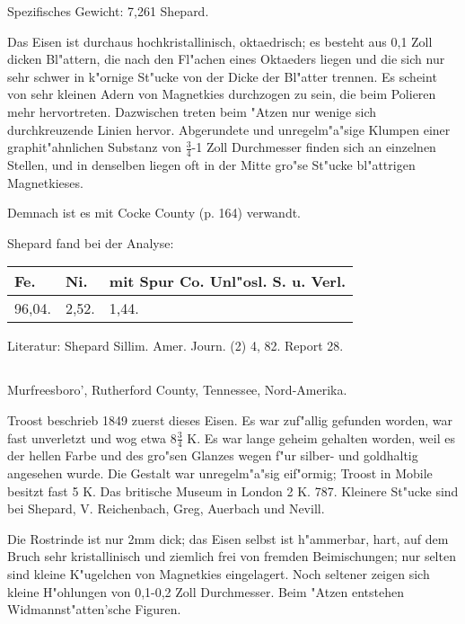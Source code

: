 \documentclass[a4paper, 11pt, oneside]{article}
\begin{document}
Spezifisches Gewicht: 7,261 Shepard.

Das Eisen ist durchaus hochkristallinisch, oktaedrisch; es besteht aus 0,1 Zoll dicken Bl"attern, die nach den Fl"achen eines Oktaeders liegen und die sich nur sehr schwer in k"ornige St"ucke von der Dicke der Bl"atter trennen. Es scheint von sehr kleinen Adern von Magnetkies durchzogen zu sein, die beim Polieren mehr hervortreten. Dazwischen treten beim "Atzen nur wenige sich durchkreuzende Linien hervor. Abgerundete und unregelm"a"sige Klumpen einer graphit"ahnlichen Substanz von $\mathfrak{\frac{3}{4}}$-1 Zoll Durchmesser finden sich an einzelnen Stellen, und in denselben liegen oft in der Mitte gro"se St"ucke bl"attrigen Magnetkieses.

Demnach ist es mit Cocke County (p. 164) verwandt.

Shepard fand bei der Analyse:
\begin{table}[H]
    \centering\swabfamily\Large
    \begin{tabular}{l l l}
        Fe. & Ni. & mit Spur Co. Unl"osl. S. u. Verl. \\ \hline
        96,04. & 2,52. & 1,44. \\
    \end{tabular}
\end{table}

\normalsize
Literatur: Shepard Sillim. Amer. Journ. (2) 4, 82. Report 28.

\subsection{}
\LARGE
\paragraph{}
Murfreesboro', Rutherford County, Tennessee, Nord-Amerika.

Troost beschrieb 1849 zuerst dieses Eisen. Es war zuf"allig gefunden worden, war fast unverletzt und wog etwa $\mathfrak{8\frac{3}{4}}$ K. Es war lange geheim gehalten worden, weil es der hellen Farbe und des gro"sen Glanzes wegen f"ur silber- und goldhaltig angesehen wurde. Die Gestalt war unregelm"a"sig eif"ormig; Troost in Mobile besitzt fast 5 K. Das britische Museum in London 2 K. 787. Kleinere St"ucke sind bei Shepard, V. Reichenbach, Greg, Auerbach und Nevill.

Die Rostrinde ist nur 2mm dick; das Eisen selbst ist h"ammerbar, hart, auf dem Bruch sehr kristallinisch und ziemlich frei von fremden Beimischungen; nur selten sind kleine K"ugelchen von Magnetkies eingelagert. Noch seltener zeigen sich kleine H"ohlungen von 0,1-0,2 Zoll Durchmesser. Beim "Atzen entstehen Widmannst"atten'sche Figuren.
\end{document}
